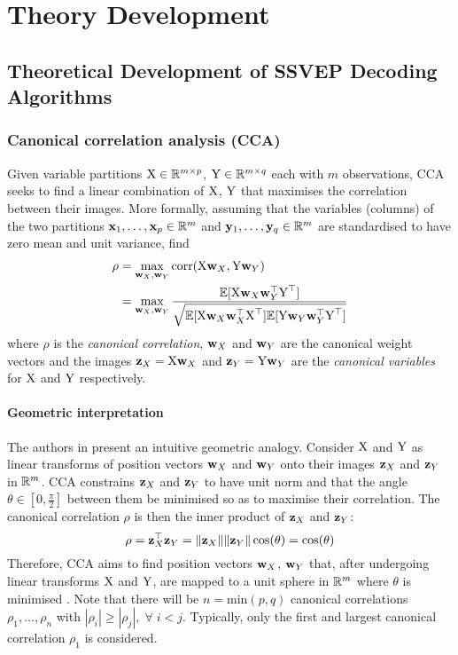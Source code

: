 \chapter{Theory Development}
\label{chapter:theory-development}

\graphicspath{ {report/C3 Theory Development/assets/} } 

\section{Theoretical Development of SSVEP Decoding Algorithms}

\subsection{Canonical correlation analysis (CCA)}
\label{section:cca-c3}
Given variable partitions ${\textrm{X}} \in \mathbb{R}^{m\times p}$, ${\textrm{Y}} \in \mathbb{R}^{m\times q}$ each with $m$ observations, CCA seeks to find a linear combination of ${\textrm{X}}$, ${\textrm{Y}}$ that maximises the correlation between their images. More formally, assuming that the variables (columns) of the two partitions ${\mathbf{x}}_1, \dots, {\mathbf{x}}_p \in \mathbb{R}^{m}$ and ${\mathbf{y}}_1, \dots, {\mathbf{y}}_q \in \mathbb{R}^{m}$ are standardised to have zero mean and unit variance, find
\begin{align}
    \rho &= \max_{{\mathbf{w}}_X, {\mathbf{w}}_Y} \textrm{corr}({\textrm{X}} {\mathbf{w}}_X, {\textrm{Y}} {\mathbf{w}}_Y) \\
    &= \max_{{\mathbf{w}}_X, {\mathbf{w}}_Y} \frac{{\mathbb{E}}[{\textrm{X}} {\mathbf{w}}_X{\mathbf{w}}_Y^\top{\textrm{Y}}^\top ]}{\sqrt{{\mathbb{E}}[{\textrm{X}} {\mathbf{w}}_X{\mathbf{w}}_X^\top{\textrm{X}}^\top]{\mathbb{E}}[{\textrm{Y}} {\mathbf{w}}_Y{\mathbf{w}}_Y^\top{\textrm{Y}}^\top]}}
    \label{eq:cca-corr-objective}
\end{align}
where $\rho$ is the \textit{canonical correlation}, ${\mathbf{w}}_X$ and ${\mathbf{w}}_Y$ are the canonical weight vectors and the images ${\mathbf{z}}_X = {\textrm{X}}{\mathbf{w}}_X$ and ${\mathbf{z}}_Y = {\textrm{Y}}{\mathbf{w}}_Y$ are the \textit{canonical variables} for ${\textrm{X}}$ and ${\textrm{Y}}$ respectively.

\subsubsection{Geometric interpretation}
The authors in \cite{cca-tutorial} present an intuitive geometric analogy. Consider ${\textrm{X}}$ and ${\textrm{Y}}$ as linear transforms of position vectors ${\mathbf{w}}_X$ and ${\mathbf{w}}_Y$ onto their images ${\mathbf{z}}_X$ and ${\mathbf{z}}_Y$ in $\mathbb{R}^m$. CCA constrains ${\mathbf{z}}_X$ and ${\mathbf{z}}_Y$ to have unit norm and that the angle $\theta \in [0, \frac{\pi}{2}]$ between them be minimised so as to maximise their correlation. The canonical correlation $\rho$ is then the inner product of ${\mathbf{z}}_X$ and ${\mathbf{z}}_Y$:
\begin{equation}
    \rho = {\mathbf{z}}_X^\top{\mathbf{z}}_Y = \|{\mathbf{z}}_X\| \|{\mathbf{z}}_Y\|\cos(\theta) = \cos(\theta)
\end{equation}
Therefore, CCA aims to find position vectors ${\mathbf{w}}_X$, ${\mathbf{w}}_Y$ that, after undergoing linear transforms ${\textrm{X}}$ and ${\textrm{Y}}$, are mapped to a unit sphere in $\mathbb{R}^m$ where $\theta$ is minimised \cite{cca-tutorial}. Note that there will be $n=\textrm{min}(p, q)$ canonical correlations $\rho_1, \dots, \rho_n$ with $|\rho_i| \geq |\rho_j|, \; \forall \; i < j$. Typically, only the first and largest canonical correlation $\rho_1$ is considered. 

